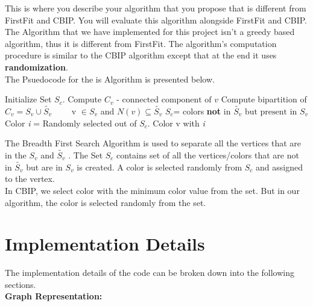 \documentclass{article}
\begin{document}
This is where you describe your algorithm that you propose that is different from FirstFit and CBIP. You will evaluate this 
algorithm alongside FirstFit and CBIP.
\bigbreak
The Algorithm that we have implemented for this project isn't a greedy based algorithm, thus it is different from FirstFit. The algorithm's
computation procedure is similar to the CBIP algorithm except that at the end it uses \textbf{randomization}.\\
The Psuedocode for the is Algorithm is presented below.
		
	\begin{multicols}{2}%
	  \begin{minipage}{0.45\textwidth}
	    \begin{algorithmic}[1]%
	      \State Initialize Set \textit{$S_c$}.
	      \State Compute $C_v \mbox{ - connected component of } v$
	      \State Compute bipartition of $C_v = S_v \cup \widetilde{S_v}$
	      \State \ \ \ \  v $\in S_v$ and $N(v) \subseteq \widetilde{S_v}$
	      \State $S_c$= colors \textbf{not} in $\widetilde{S_v} \mbox{ but present in } S_v$
	      \State Color \textit{i} = Randomly selected out of $S_c$.
	      \State Color v with \textit{i}
	      \EndProcedure
	    \end{algorithmic}
	  \end{minipage}
	The Breadth First Search Algorithm is used to separate all the vertices that are in the $S_v$ and $\widetilde{S_v}$ . 
	The Set $S_c$ contains set of all the vertices/colors that are not in $\widetilde {S_v}$ but are in $S_v$ is created.
	 A color is selected randomly from $S_c$  and assigned to the vertex.\\

	 In CBIP, we select color with the minimum color value from the set. But in our algorithm, the color is selected randomly from the set.

	\end{multicols}	


\section{Implementation Details}

\bigbreak
The implementation details of the code can be broken down into the following sections.\\

\textbf{Graph Representation:}\\
\end{document}
